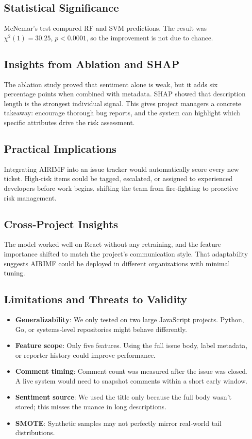 \documentclass[conference]{IEEEtran}
\begin{document}
\subsection{Statistical Significance}
McNemar's test compared RF and SVM predictions. The result was $\chi^2(1) = 30.25$, $p < 0.0001$, so the improvement is not due to chance.

\subsection{Insights from Ablation and SHAP}
The ablation study proved that sentiment alone is weak, but it adds six percentage points when combined with metadata. SHAP showed that description length is the strongest individual signal. This gives project managers a concrete takeaway: encourage thorough bug reports, and the system can highlight which specific attributes drive the risk assessment.

\subsection{Practical Implications}
Integrating AIRIMF into an issue tracker would automatically score every new ticket. High‑risk items could be tagged, escalated, or assigned to experienced developers before work begins, shifting the team from fire‑fighting to proactive risk management.

\subsection{Cross‑Project Insights}
The model worked well on React without any retraining, and the feature importance shifted to match the project's communication style. That adaptability suggests AIRIMF could be deployed in different organizations with minimal tuning.

\subsection{Limitations and Threats to Validity}
\begin{itemize}
    \item \textbf{Generalizability}: We only tested on two large JavaScript projects. Python, Go, or systems‑level repositories might behave differently.
    \item \textbf{Feature scope}: Only five features. Using the full issue body, label metadata, or reporter history could improve performance.
    \item \textbf{Comment timing}: Comment count was measured after the issue was closed. A live system would need to snapshot comments within a short early window.
    \item \textbf{Sentiment source}: We used the title only because the full body wasn't stored; this misses the nuance in long descriptions.
    \item \textbf{SMOTE}: Synthetic samples may not perfectly mirror real‑world tail distributions.
\end{itemize}
\end{document}
